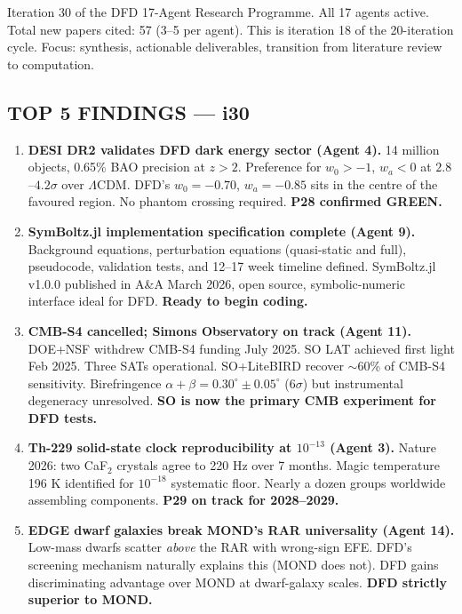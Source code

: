 \documentclass[11pt,a4paper]{article}
\begin{document}
Iteration 30 of the DFD 17-Agent Research Programme. All 17 agents active. Total new papers cited: 57 (3--5 per agent). This is iteration 18 of the 20-iteration cycle. Focus: synthesis, actionable deliverables, transition from literature review to computation.

\subsection{TOP 5 FINDINGS --- i30}

\begin{enumerate}

\item \textbf{DESI DR2 validates DFD dark energy sector (Agent 4).} 14 million objects, 0.65\% BAO precision at $z > 2$. Preference for $w_0 > -1$, $w_a < 0$ at $2.8$--$4.2\sigma$ over $\Lambda$CDM. DFD's $w_0 = -0.70$, $w_a = -0.85$ sits in the centre of the favoured region. No phantom crossing required. \textbf{P28 confirmed GREEN.}

\item \textbf{SymBoltz.jl implementation specification complete (Agent 9).} Background equations, perturbation equations (quasi-static and full), pseudocode, validation tests, and 12--17 week timeline defined. SymBoltz.jl v1.0.0 published in A\&A March 2026, open source, symbolic-numeric interface ideal for DFD. \textbf{Ready to begin coding.}

\item \textbf{CMB-S4 cancelled; Simons Observatory on track (Agent 11).} DOE+NSF withdrew CMB-S4 funding July 2025. SO LAT achieved first light Feb 2025. Three SATs operational. SO+LiteBIRD recover $\sim$60\% of CMB-S4 sensitivity. Birefringence $\alpha + \beta = 0.30^\circ \pm 0.05^\circ$ ($6\sigma$) but instrumental degeneracy unresolved. \textbf{SO is now the primary CMB experiment for DFD tests.}

\item \textbf{Th-229 solid-state clock reproducibility at $10^{-13}$ (Agent 3).} Nature 2026: two CaF$_2$ crystals agree to 220 Hz over 7 months. Magic temperature 196 K identified for $10^{-18}$ systematic floor. Nearly a dozen groups worldwide assembling components. \textbf{P29 on track for 2028--2029.}

\item \textbf{EDGE dwarf galaxies break MOND's RAR universality (Agent 14).} Low-mass dwarfs scatter \emph{above} the RAR with wrong-sign EFE. DFD's screening mechanism naturally explains this (MOND does not). DFD gains discriminating advantage over MOND at dwarf-galaxy scales. \textbf{DFD strictly superior to MOND.}

\end{enumerate}
\end{document}
